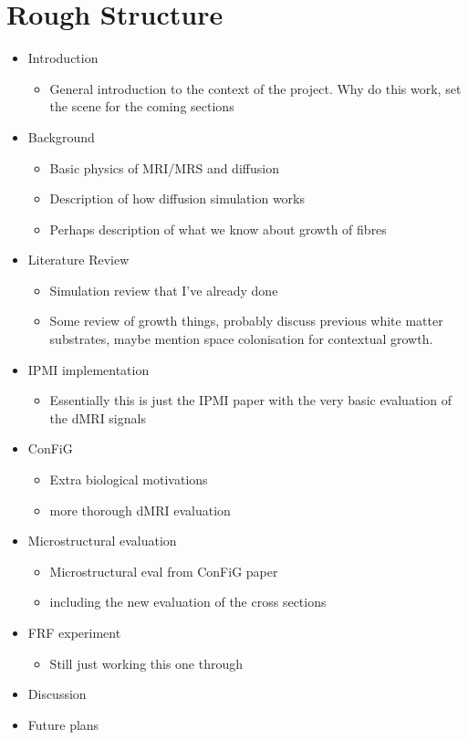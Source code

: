 \section{Rough Structure}
\begin{itemize}
	\item Introduction
	\begin{itemize}
		\item General introduction to the context of the project. Why do this work, set the scene for the coming sections
	\end{itemize}
	\item Background
	\begin{itemize}
		\item Basic physics of MRI/MRS and diffusion
		\item Description of how diffusion simulation works
		\item Perhaps description of what we know about growth of fibres
	\end{itemize}
	\item Literature Review
	\begin{itemize}
		\item Simulation review that I've already done
		\item Some review of growth things, probably discuss previous white matter substrates, maybe mention space colonisation for contextual growth.
	\end{itemize}
      \item IPMI implementation
	\begin{itemize}
        \item Essentially this is just the IPMI paper with the very basic evaluation of the dMRI signals
		\end{itemize}
	  \item ConFiG
		\begin{itemize}
		\item Extra biological motivations
		\item more thorough dMRI evaluation
		\end{itemize}
	  \item Microstructural evaluation
		\begin{itemize}
		\item Microstructural eval from ConFiG paper
		\item including the new evaluation of the cross sections
		\end{itemize}
	  \item FRF experiment
		\begin{itemize}
		\item Still just working this one through
		\end{itemize}
      \item Discussion
      \item Future plans
\end{itemize}


